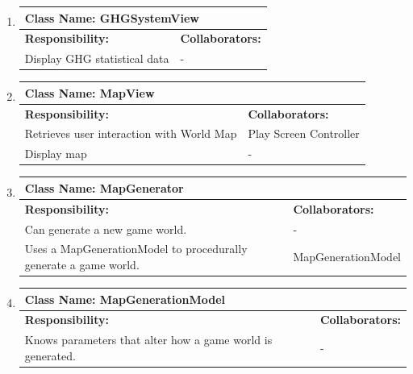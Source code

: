 \documentclass[]{article}
\begin{document}
\begin{enumerate}[1.]
\begin{tabular}{|p{10cm}|p{4cm}|}
	    \hline
	  \end{tabular}

	\item
	\begin{tabular}{|p{10cm}|p{4cm}|}
	    \hline
	     \multicolumn{2}{|l|}{\textbf{Class Name:  GHGSystemView}} \\
	    \hline
	    \textbf{Responsibility:} & \textbf{Collaborators:} \\
	    \hline
	    Display GHG statistical data & - \\

	    \hline
	  \end{tabular}

	\item
	\begin{tabular}{|p{10cm}|p{4cm}|}
	    \hline
	     \multicolumn{2}{|l|}{\textbf{Class Name:  MapView}} \\
	    \hline
	    \textbf{Responsibility:} & \textbf{Collaborators:} \\
	    \hline
	    Retrieves user interaction with World Map & Play Screen Controller \\
	Display map & - \\

	    \hline
	  \end{tabular}

	\item
	\begin{tabular}{|p{10cm}|p{4cm}|}
	    \hline
	     \multicolumn{2}{|l|}{\textbf{Class Name:  MapGenerator}} \\
	    \hline
	    \textbf{Responsibility:} & \textbf{Collaborators:} \\
	    \hline
	    Can generate a new game world. & - \\
	Uses a MapGenerationModel to procedurally generate a game world. & MapGenerationModel \\

	    \hline
	  \end{tabular}

	\item
	\begin{tabular}{|p{10cm}|p{4cm}|}
	    \hline
	     \multicolumn{2}{|l|}{\textbf{Class Name:  MapGenerationModel}} \\
	    \hline
	    \textbf{Responsibility:} & \textbf{Collaborators:} \\
	    \hline
	    Knows parameters that alter how a game world is generated. & - \\


\end{tabular}
\end{enumerate}
\end{document}
